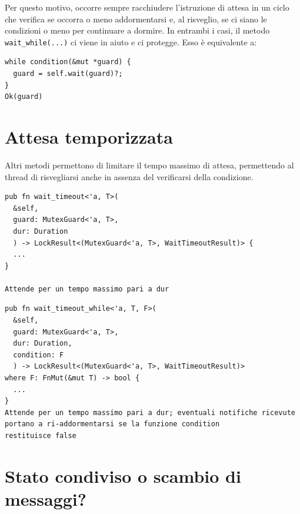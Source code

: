 Per questo motivo, occorre sempre racchiudere l'istruzione di attesa in un ciclo
che verifica se occorra o meno addormentarsi e, al risveglio, se ci siano le
condizioni o meno per continuare a dormire.
In entrambi i casi, il metodo \verb|wait_while(...)| ci viene in aiuto e ci protegge.
Esso è equivalente a:

\begin{verbatim}
while condition(&mut *guard) {
  guard = self.wait(guard)?;
}
Ok(guard)
\end{verbatim}

\section{Attesa temporizzata}
Altri metodi permettono di limitare il tempo massimo di attesa, permettendo al
thread di risvegliarsi anche in assenza del verificarsi della condizione.

\begin{center}
  \begin{minipage}{0.45\linewidth}
    \begin{verbatim}
pub fn wait_timeout<'a, T>(
  &self,
  guard: MutexGuard<'a, T>,
  dur: Duration
  ) -> LockResult<(MutexGuard<'a, T>, WaitTimeoutResult)> {
  ...
}

Attende per un tempo massimo pari a dur
\end{verbatim}
  \end{minipage}%
  \hfill
  \begin{minipage}{0.45\linewidth}
    \begin{verbatim}
pub fn wait_timeout_while<'a, T, F>(
  &self,
  guard: MutexGuard<'a, T>,
  dur: Duration,
  condition: F
  ) -> LockResult<(MutexGuard<'a, T>, WaitTimeoutResult)>
where F: FnMut(&mut T) -> bool {
  ...
}
Attende per un tempo massimo pari a dur; eventuali notifiche ricevute portano a ri-addormentarsi se la funzione condition
restituisce false
\end{verbatim}
  \end{minipage}
\end{center}


\section{Stato condiviso o scambio di messaggi?}


